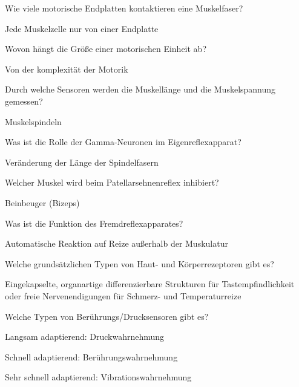 \documentclass[10pt, a4paper]{exam}
\begin{document}
\begin{questions}
  \question Wie viele motorische Endplatten kontaktieren eine Muskelfaser?
  \begin{solution}
    Jede Muskelzelle nur von einer Endplatte
  \end{solution}

  \question Wovon hängt die Größe einer motorischen Einheit ab?
  \begin{solution}
    Von der komplexität der Motorik
  \end{solution}

  \question Durch welche Sensoren werden die Muskellänge und die Muskelspannung gemessen?
  \begin{solution}
    Muskelspindeln
  \end{solution}

  \question Was ist die Rolle der Gamma-Neuronen im Eigenreflexapparat?
  \begin{solution}
    Veränderung der Länge der Spindelfasern
  \end{solution}

  \question Welcher Muskel wird beim Patellarsehnenreflex inhibiert?
  \begin{solution}
    Beinbeuger (Bizeps)
  \end{solution}

  \question Was ist die Funktion des Fremdreflexapparates?
  \begin{solution}
    Automatische Reaktion auf Reize außerhalb der Muskulatur
  \end{solution}

  \question Welche grundsätzlichen Typen von Haut- und Körperrezeptoren gibt es?
  \begin{solution}
    Eingekapselte, organartige differenzierbare Strukturen für Tastempfindlichkeit oder freie Nervenendigungen für Schmerz- und Temperaturreize
  \end{solution}

  \question Welche Typen von Berührungs/Drucksensoren gibt es?
  \begin{solution}
    \begin{itemize*}
      \item Langsam adaptierend: Druckwahrnehmung
      \item Schnell adaptierend: Berührungswahrnehmung
      \item Sehr schnell adaptierend: Vibrationswahrnehmung
    \end{itemize*}
  \end{solution}


\end{questions}
\end{document}
